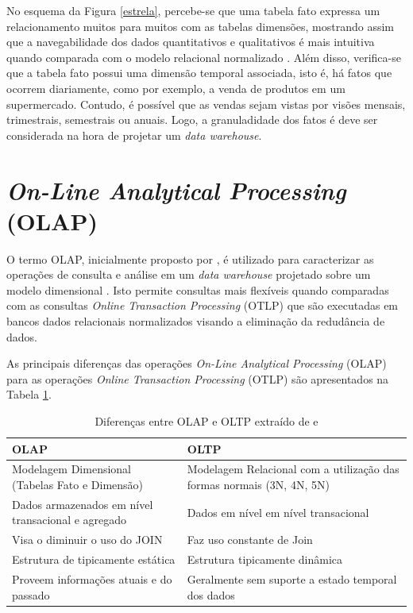 No esquema da Figura \ref{estrela}, percebe-se que uma tabela fato expressa um relacionamento muitos para muitos com as tabelas dimensões, mostrando assim que a navegabilidade dos dados quantitativos e qualitativos é mais intuitiva quando comparada com o modelo relacional normalizado \cite{Kimball2002}. Além disso, verifica-se que a tabela fato possui uma dimensão temporal associada, isto é, há fatos que ocorrem diariamente, como por exemplo, a venda de produtos em um supermercado. Contudo, é possível que as vendas sejam vistas por visões mensais, trimestrais, semestrais ou anuais. Logo, a granuladidade dos fatos é deve ser considerada na hora de projetar um \textit{data warehouse}.




\section{\textit{On-Line Analytical Processing} (OLAP)}

O termo OLAP, inicialmente proposto por , é utilizado para caracterizar as operações de consulta e análise em um \textit{data warehouse} projetado sobre um modelo dimensional \cite{Kimball2002}. Isto permite consultas mais flexíveis quando comparadas com as consultas \textit{Online Transaction Processing} (OTLP) que são executadas em bancos dados relacionais normalizados  visando a eliminação da redudância de dados.

As principais diferenças das operações \textit{On-Line Analytical Processing} (OLAP) para as operações 
\textit{Online Transaction Processing} (OTLP) são apresentados na Tabela 
\ref{olapxoltp}.

	\begin{table}[!ht]
	\begin{center}
	 \begin{tabular}{|p{5cm}|p{5cm}|}
		\hline
		OLAP & OLTP \\ \hline
		Modelagem Dimensional (Tabelas Fato e Dimensão) & Modelagem Relacional com a utilização das formas normais (3N, 4N, 5N) \\ \hline
		Dados armazenados em nível transacional e agregado    & Dados em nível em nível transacional        \\ \hline
		Visa o diminuir o uso do JOIN & Faz uso constante de Join   \\ \hline
		Estrutura de tipicamente estática   & Estrutura tipicamente dinâmica      \\ \hline
		Proveem informações atuais e do passado & Geralmente sem suporte a estado temporal dos dados
		      \\ \hline
		\end{tabular}
		\caption{Diferenças entre OLAP e OLTP extraído de  e }
		\label{olapxoltp}
		\end{center}
		\end{table}

